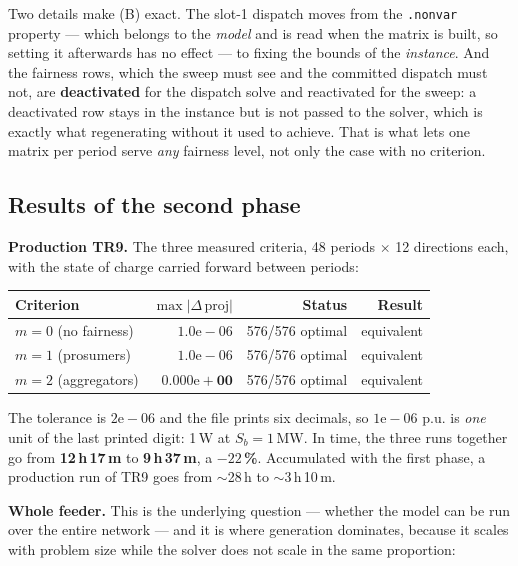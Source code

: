\documentclass[11pt,a4paper]{article}
\newcommand{\nw}[1]{\textcolor{uaired}{#1}}
\begin{document}
Two details make \nw{(B)} exact. The slot-1 dispatch moves from the \texttt{.nonvar} property ---
which belongs to the \emph{model} and is read when the matrix is built, so setting it afterwards has
no effect --- to fixing the bounds of the \emph{instance}. And the fairness rows, which the sweep must
see and the committed dispatch must not, are \textbf{deactivated} for the dispatch solve and
reactivated for the sweep: a deactivated row stays in the instance but is not passed to the solver,
which is exactly what regenerating without it used to achieve. That is what lets one matrix per
period serve \emph{any} fairness level, not only the case with no criterion.

\subsection{\nw{Results of the second phase}}

\textbf{Production TR9.} The three measured criteria, 48 periods $\times$ 12 directions each, with the
state of charge carried forward between periods:

\begin{center}\small
\begin{tabular}{l r r r}
\toprule
Criterion & $\max|\Delta\,\mathrm{proj}|$ & Status & Result \\
\midrule
$m=0$ (no fairness)   & $1.0\mathrm{e}{-}06$ & 576/576 optimal & \nw{equivalent} \\
$m=1$ (prosumers)     & $1.0\mathrm{e}{-}06$ & 576/576 optimal & \nw{equivalent} \\
$m=2$ (aggregators)   & $\mathbf{0.000\mathrm{e}{+}00}$ & 576/576 optimal & \nw{equivalent} \\
\bottomrule
\end{tabular}
\end{center}

The tolerance is $2\mathrm{e}{-}06$ and the file prints six decimals, so $1\mathrm{e}{-}06$ p.u. is
\emph{one} unit of the last printed digit: 1\,W at $S_b=1$\,MW. In time, the three runs together go
from \textbf{12\,h\,17\,m} to \textbf{9\,h\,37\,m}, a \textbf{$-22$\,\%}. Accumulated with the first
phase, a production run of TR9 goes from $\sim$28\,h to $\sim$3\,h\,10\,m.

\vspace{2mm}
\textbf{\nw{Whole feeder.}} This is the underlying question --- whether the model can be run over the
entire network --- and it is where generation dominates, because it scales with problem size while
the solver does not scale in the same proportion:
\end{document}
